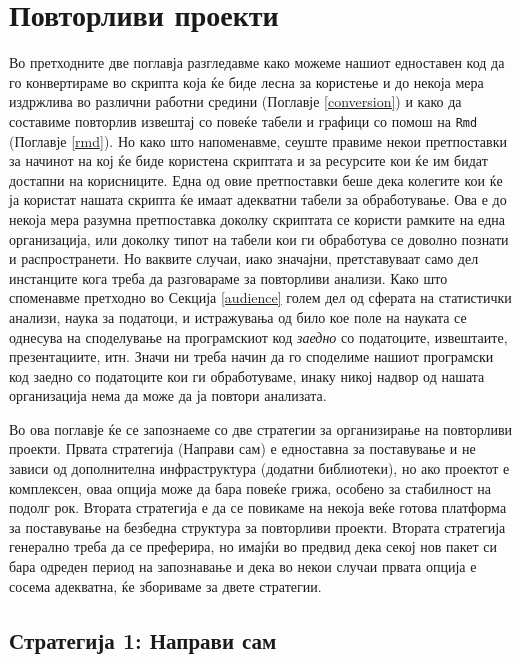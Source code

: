 \documentclass[
]{book}
\begin{document}
\hypertarget{proekti}{%
\chapter{Повторливи проекти}\label{proekti}}

Во претходните две поглавја разгледавме како можеме нашиот едноставен код да го конвертираме во скрипта која ќе биде лесна за користење и до некоја мера издржлива во различни работни средини (Поглавје \ref{conversion}) и како да составиме повторлив извештај со повеќе табели и графици со помош на \texttt{Rmd} (Поглавје \ref{rmd}). Но како што напоменавме, сеуште правиме некои претпоставки за начинот на кој ќе биде користена скриптата и за ресурсите кои ќе им бидат достапни на корисниците. Една од овие претпоставки беше дека колегите кои ќе ја користат нашата скрипта ќе имаат адекватни табели за обработување. Ова е до некоја мера разумна претпоставка доколку скриптата се користи рамките на една организација, или доколку типот на табели кои ги обработува се доволно познати и распространети. Но ваквите случаи, иако значајни, претставуваат само дел инстанците кога треба да разговараме за повторливи анализи. Како што споменавме претходно во Секција \ref{audience} голем дел од сферата на статистички анализи, наука за податоци, и истражувања од било кое поле на науката се однесува на споделување на програмскиот код \emph{заедно} со податоците, извештаите, презентациите, итн. Значи ни треба начин да го споделиме нашиот програмски код заедно со податоците кои ги обработуваме, инаку никој надвор од нашата организација нема да може да ја повтори анализата.

Во ова поглавје ќе се запознаеме со две стратегии за организирање на повторливи проекти. Првата стратегија (Направи сам) е едноставна за поставување и не зависи од дополнителна инфраструктура (додатни библиотеки), но ако проектот е комплексен, оваа опција може да бара повеќе грижа, особено за стабилност на подолг рок. Втората стратегија е да се повикаме на некоја веќе готова платформа за поставување на безбедна структура за повторливи проекти. Втората стратегија генерално треба да се преферира, но имајќи во предвид дека секој нов пакет си бара одреден период на запознавање и дека во некои случаи првата опција е сосема адекватна, ќе збориваме за двете стратегии.

\hypertarget{ux441ux442ux440ux430ux442ux435ux433ux438ux458ux430-1-ux43dux430ux43fux440ux430ux432ux438-ux441ux430ux43c}{%
\section{Стратегија 1: Направи сам}\label{ux441ux442ux440ux430ux442ux435ux433ux438ux458ux430-1-ux43dux430ux43fux440ux430ux432ux438-ux441ux430ux43c}}
\end{document}
